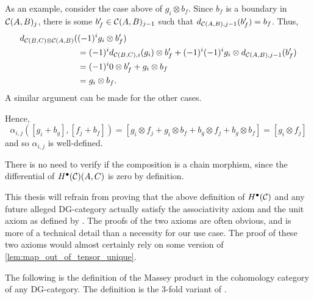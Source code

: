 \begin{remark}
\begin{enumerate}
{            As an example, consider the case above of \( g_i \otimes b_f \). Since \( b_f \) is a boundary in \( {\mathcal{C}}(A, B)_j \), there is some \( b_f' \in {\mathcal{C}}(A, B)_{j - 1} \) such that \( d_{{\mathcal{C}}(A, B), j - 1}(b_f') = b_f \). Thus,
            \begin{align*}
                d_{{\mathcal{C}}(B, C) \otimes {\mathcal{C}}(A, B)}(&(-1)^i g_i \otimes b_f') \\
                &= (-1)^i d_{{\mathcal{C}}(B, C), i}(g_i) \otimes b_f' + (-1)^i (-1)^i g_i \otimes d_{{\mathcal{C}}(A, B), j - 1}(b_f') \\
                &= (-1)^i 0 \otimes b_f' + g_i \otimes b_f \\
                &= g_i \otimes b_f.
            \end{align*}
            A similar argument can be made for the other cases.

            Hence,
            \[
                \alpha_{i, j}([g_i + b_g], [f_j + b_f]) = [g_i \otimes f_j + g_i \otimes b_f + b_g \otimes f_j + b_g \otimes b_f] = [g_i \otimes f_j]
            \]
            and so \( \alpha_{i, j} \) is well-defined.
        }
    \end{enumerate}
    There is no need to verify if the composition is a chain morphism, since the differential of \( H^\bullet({\mathcal{C}})(A, C) \) is zero by definition.
\end{remark}

This thesis will refrain from proving that the above definition of \( H^\bullet({\mathcal{C}}) \) and any future alleged DG-category actually satisfy the associativity axiom and the unit axiom as defined by \cite[Definition 6.2.1]{Borceux_1994}. The proofs of the two axioms are often obvious, and is more of a technical detail than a necessity for our use case. The proof of these two axioms would almost certainly rely on some version of \autoref{lem:map_out_of_tensor_unique}.

The following is the definition of the Massey product in the cohomology category of any DG-category. The definition is the 3-fold variant of \cite[Definition 4.2.1]{Jasso-Muro_2023}.

